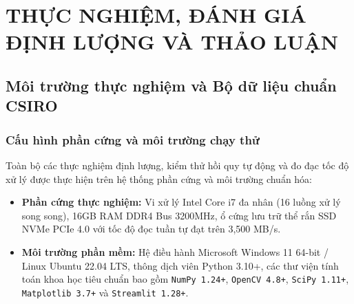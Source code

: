 \chapter{THỰC NGHIỆM, ĐÁNH GIÁ ĐỊNH LƯỢNG VÀ THẢO LUẬN}
\label{ch:experiments}

\section{Môi trường thực nghiệm và Bộ dữ liệu chuẩn CSIRO}
\label{sec:dataset_and_env}

\subsection{Cấu hình phần cứng và môi trường chạy thử}
Toàn bộ các thực nghiệm định lượng, kiểm thử hồi quy tự động và đo đạc tốc độ xử lý được thực hiện trên hệ thống phần cứng và môi trường chuẩn hóa:
\begin{itemize}
    \item \textbf{Phần cứng thực nghiệm:} Vi xử lý Intel Core i7 đa nhân (16 luồng xử lý song song), 16GB RAM DDR4 Bus 3200MHz, ổ cứng lưu trữ thể rắn SSD NVMe PCIe 4.0 với tốc độ đọc tuần tự đạt trên 3,500 MB/s.
    \item \textbf{Môi trường phần mềm:} Hệ điều hành Microsoft Windows 11 64-bit / Linux Ubuntu 22.04 LTS, thông dịch viên Python 3.10+, các thư viện tính toán khoa học tiêu chuẩn bao gồm \texttt{NumPy 1.24+}, \texttt{OpenCV 4.8+}, \texttt{SciPy 1.11+}, \texttt{Matplotlib 3.7+} và \texttt{Streamlit 1.28+}.
\end{itemize}

